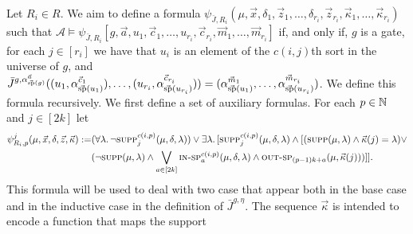 \documentclass[../main/thesis.tex]{subfiles}
\begin{document}
Let $R_i \in R$. We aim to define a formula $\psi_{\bar{J}, R_i} (\mu, \vec{x},
\delta_{1}, \vec{z}_1, \ldots, \delta_{r_i}, \vec{z}_{r_i}, \vec{\kappa}_1,
\ldots, \vec{\kappa}_{r_i})$ such that $\mathcal{A} \models \psi_{\bar{J}, R_i}
[g, \vec{a}, u_1, \vec{c}_1, \ldots, u_{r_i}, \vec{c}_{r_i}, \vec{m}_1, \ldots,
\vec{m}_{r_i}]$ if, and only if, $g$ is a gate, for each $j \in [r_i]$ we have
that $u_i$ is an element of the $c(i, j)$th sort in the universe of $g$, and
$\bar{J}^{g, \alpha^{\vec{a}}_{\vec{\text{sp}}(g)}} ( (u_1,
\alpha^{\vec{c}_1}_{\vec{\text{sp}}(u_1)}), \ldots, (u_{r_i},
\alpha^{\vec{c}_{r_i}}_{\vec{\text{sp}}(u_{r_i})})) =
(\alpha^{\vec{m}_1}_{\vec{\text{sp}}(u_1)}, \ldots,
\alpha^{\vec{m}_{r_i}}_{\vec{\text{sp}}(u_{r_i})})$. We define this formula
recursively. We first define a set of auxiliary formulas. For each $p \in \mathbb{N}$
and $j \in [2k]$ let
\begin{align*}
  \psi^j_{R_i, p}(\mu, \vec{x}, \delta, \vec{z}, \vec{\kappa}) :=  & (\forall \lambda .\, \neg \textsc{supp}^{c(i, p)}_j(\mu, \delta, \lambda)) \lor \exists \lambda . \, [ \textsc{supp}^{c(i, p)}_j(\mu, \delta, \lambda)  \land   [(\textsc{supp}(\mu, \lambda) \land \vec{\kappa} (j) = \lambda) \lor \\ & (\neg \textsc{supp}(\mu, \lambda) \land   \bigvee_{a \in [2k]} \textsc{in-sp}^{c(i, p)}_a (\mu, \delta, \lambda) \land \textsc{out-sp}_{(p-1)k + a} (\mu, \vec{\kappa}(j)))]].
\end{align*}
This formula will be used to deal with two case that appear both in the base
case and in the inductive case in the definition of $\bar{J}^{g, \eta}$. The
sequence $\vec{\kappa}$ is intended to encode a function that maps the support
\end{document}
